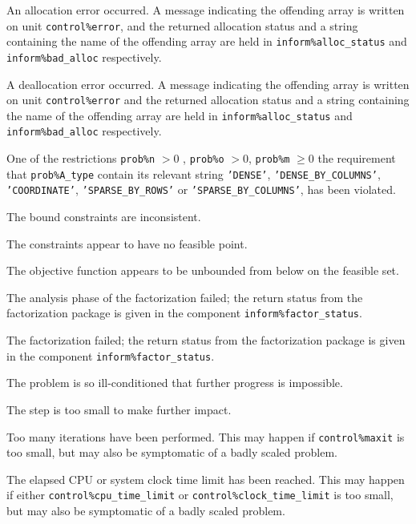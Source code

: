 \documentclass{galahad}
\begin{document}
\begin{description}

 An allocation error occurred. A message indicating
the offending
array is written on unit {\tt control\%error}, and the returned allocation
status and a string containing the name of the offending array
are held in {\tt inform\%alloc\_\-status}
and {\tt inform\%bad\_alloc} respectively.

 A deallocation error occurred.
A message indicating the offending
array is written on unit {\tt control\%error} and the returned allocation
status and a string containing the name of the offending array
are held in {\tt inform\%alloc\_\-status}
and {\tt inform\%bad\_alloc} respectively.

 One of the restrictions
 {\tt prob\%n} $> 0$ , {\tt prob\%o} $> 0$, {\tt prob\%m} $\geq 0$
    the requirement that {\tt prob\%A\_type} contain its relevant string
    {\tt 'DENSE'}, {\tt 'DENSE\_BY\_COLUMNS'}, {\tt 'COORDINATE'},
   {\tt 'SPARSE\_BY\_ROWS'} or {\tt 'SPARSE\_BY\_COLUMNS'},
    has been violated.

 The bound constraints are inconsistent.

 The constraints appear to have no feasible point.

 The objective function appears to be unbounded
  from below on the feasible set.

 The analysis phase of the factorization failed;
  the return status from the factorization
    package is given in the component {\tt inform\%fac\-t\-or\_status}.

 The factorization failed; the return status
  from the factorization
    package is given in the component {\tt inform\%fac\-t\-or\_status}.

 The problem is so ill-conditioned that
 further progress is impossible.

 The step is too small to make further impact.

 Too many iterations have been performed.
   This may happen if
    {\tt control\%maxit} is too small, but may also be symptomatic of
    a badly scaled problem.

 The elapsed CPU or system clock time limit has been
    reached. This may happen if either {\tt control\%cpu\_time\_limit} or
    {\tt control\%clock\_time\_limit} is too small, but may also be symptomatic
    of a badly scaled problem.

\end{description}
\end{document}
